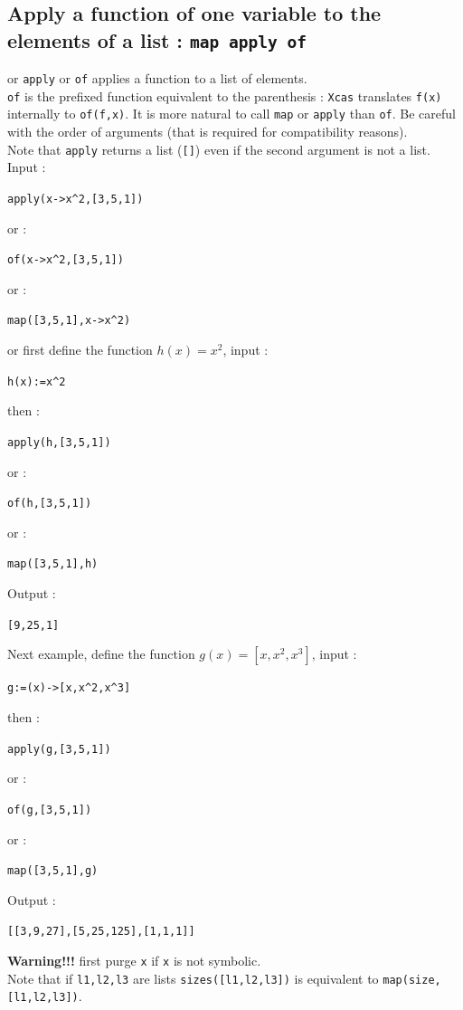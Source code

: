 \documentclass[a4paper,11pt]{book}
\begin{document}
\subsection{Apply a function of one variable to the elements of a list : {\tt map apply of}}
 or  {\tt apply} or {\tt of} applies a function to a list
of elements.\\
{\tt of} is the prefixed function equivalent to the parenthesis  : 
{\tt Xcas} translates {\tt f(x)} internally to {\tt of(f,x)}. 
It is more natural to call {\tt map} 
or {\tt apply} than {\tt of}. Be careful with the order of arguments
(that is required for compatibility reasons).\\
Note that {\tt apply} returns a list ({\tt []})
even if the second argument is not a list.\\
Input :
\begin{center}{\tt apply(x->x\verb|^|2,[3,5,1])}\end{center}
or :
\begin{center}{\tt of(x->x\verb|^|2,[3,5,1])}\end{center}
or :
\begin{center}{\tt map([3,5,1],x->x\verb|^|2)}\end{center}
or first define the function $h(x)=x^2$, input :
\begin{center}{\tt h(x):=x\verb|^|2}\end{center}
then :
\begin{center}{\tt apply(h,[3,5,1])}\end{center}
or :
\begin{center}{\tt of(h,[3,5,1])}\end{center}
or :
\begin{center}{\tt map([3,5,1],h)}\end{center}
Output :
\begin{center}{\tt   [9,25,1]}\end{center}
Next example, define the function $g(x)=[x,x^2,x^3]$, input :
\begin{center}{\tt g:=(x)->[x,x\verb|^|2,x\verb|^|3]}\end{center}
then :
\begin{center}{\tt apply(g,[3,5,1])}\end{center}
or :
\begin{center}{\tt of(g,[3,5,1])}\end{center}
or :
\begin{center}{\tt map([3,5,1],g)}\end{center}
Output :
\begin{center}{\tt   [[3,9,27],[5,25,125],[1,1,1]]}\end{center}
{\bf Warning!!!} first purge {\tt x} if {\tt x} is not symbolic.\\
Note that if {\tt l1,l2,l3} are lists
{\tt sizes([l1,l2,l3])} is equivalent to {\tt map(size,[l1,l2,l3])}.
\end{document}

